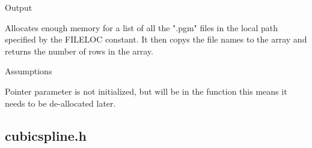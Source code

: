 \documentclass[pdftex, 11pt]{article}
\begin{document}
\begin{description}
\begin{description}
			\item{Output}

				Allocates enough memory for a list of all the ".pgm" files
				in the local path specified by the FILELOC constant.  It
				then copys the file names to the array and returns the
				number of rows in the array.

			\item{Assumptions}

				Pointer parameter is not initialized, but will be in the function
				this means it needs to be de-allocated later.

		\end{description}


\end{description}

\subsection{cubicspline.h}
\end{document}
